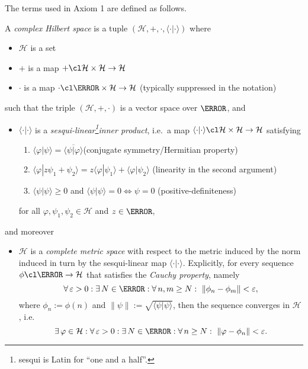     The terms used in Axiom 1 are defined as follows.

    \begin{definition}
        A \emph{complex Hilbert space} is a tuple $(\mathcal{H},+,\cdot,\langle \cdot | \cdot \rangle)$ where
        \begin{itemize}
            \item $\mathcal{H}$ is a set
            \item $+$ is a map $+\cl\mathcal{H}\times \mathcal{H}\to \mathcal{H}$
            \item $\cdot$ is a map $\cdot \cl \C \times \mathcal{H}\to \mathcal{H}$ (typically suppressed in the notation)
        \end{itemize}
        such that the triple $(\mathcal{H},+,\cdot)$ is a vector space over $\C$, and
        \begin{itemize}
            \item $\langle \cdot | \cdot \rangle$ is a \emph{sesqui-linear\footnote{sesqui is Latin for ``one and a half''.}inner product}, i.e.\ a map $\langle \cdot | \cdot \rangle\cl\mathcal{H}\times \mathcal{H}\to \mathcal{H}$ satisfying
            \begin{enumerate}[label=(\roman*)]
                \item $\langle \varphi|\psi\rangle=\overline{\langle \psi|\varphi\rangle}$\hfill (conjugate symmetry/Hermitian property)
                \item $\langle \varphi|z\psi_1+\psi_2\rangle=z\langle \varphi|\psi_1\rangle+\langle \varphi|\psi_2\rangle$ \hfill (linearity in the second argument)
                \item $\langle \psi | \psi\rangle \geq 0$ and $\langle \psi|\psi\rangle = 0 \Leftrightarrow \psi = 0$ \hfill (positive-definiteness)
            \end{enumerate}
            for all $\varphi,\psi_1,\psi_2\in\mathcal{H}$ and $z\in \C$,
        \end{itemize}
        and moreover
        \begin{itemize}
            \item $\mathcal{H}$ is a \emph{complete metric space} with respect to the metric induced by the norm induced in turn by the sesqui-linear map $\langle \cdot | \cdot \rangle$. Explicitly, for every sequence $\phi\cl \N \to \mathcal{H}$ that satisfies the \emph{Cauchy property}, namely
            \begin{equation*}
                \forall \, \varepsilon > 0 : \exists \, N\in \N : \forall \, n,m \geq N : \ \|\phi_n-\phi_m\|< \varepsilon,
            \end{equation*}
            where $\phi_n:=\phi(n)$ and $\|\psi\|:=\sqrt{\langle \psi | \psi \rangle}$, then the sequence converges in $\mathcal{H}$, i.e.\
            \begin{equation*}
                \exists \, \varphi\in\mathcal{H}:\forall \, \varepsilon > 0 : \exists \, N\in \N : \forall \, n \geq N : \ \|\varphi-\phi_n\|< \varepsilon.
            \end{equation*}
        \end{itemize}
    \end{definition}
